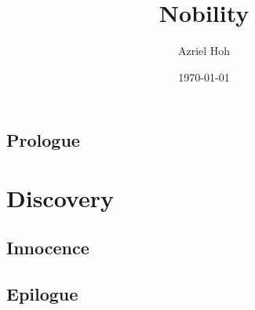 \documentclass[11pt]{book}
\title{\bf Nobility}
\author{Azriel Hoh}
\date{\today}
\begin{document}
\frontmatter
\maketitle
\tableofcontents
\chapter{Prologue}

\mainmatter
\part{Discovery}
\chapter{Innocence}

\backmatter
\chapter{Epilogue}
\end{document}
